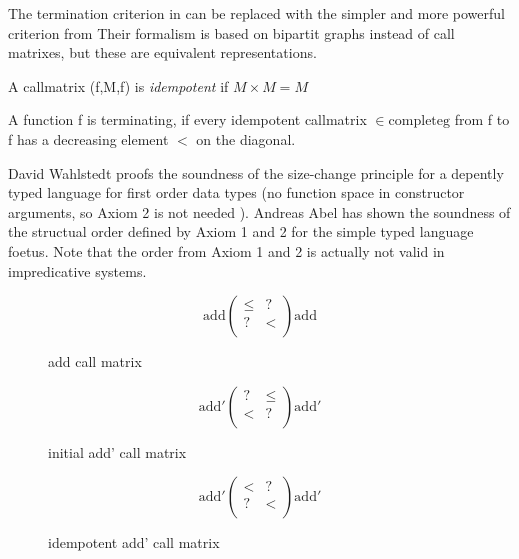 The termination criterion in \cite{abelAltenkirch:predStRec} can be replaced with the
simpler and more powerful criterion from \cite{lee01sizechange}
Their formalism is based on bipartit graphs instead of call matrixes, but these are
equivalent representations.

\begin{definition}
A callmatrix (f,M,f) is \emph{idempotent} if $ M \times M = M $ 
\end{definition}

\begin{definition}
A function f is terminating, if every idempotent callmatrix  $ \in \mathrm{complete g} $ from f to f has a decreasing element $<$ on
the diagonal.
\end{definition}

David Wahlstedt proofs the soundness of the size-change principle for a depently typed language 
for first order data types (no function space in constructor arguments, so Axiom 2 is not needed ).
Andreas Abel has shown the soundness of the structual order defined by Axiom 1 and 2 for the simple typed
language foetus.
Note that the order from Axiom 1 and 2 is actually not valid in impredicative systems.

\begin{figure}[p]
\[
\mathrm{add}\begin{pmatrix}

\leq & ? \\
?    & < \\

\end{pmatrix}\mathrm{add}
\]
\caption{add call matrix}
\end{figure}

\begin{figure}[p]

\[
\mathrm{add'} \begin{pmatrix}

? & \leq \\
< & ?   \\

\end{pmatrix} \mathrm{add'}
\]

\caption{initial add' call matrix}

\end{figure}

\begin{figure}[p]

\[
\mathrm{add'} \begin{pmatrix}

< & ?    \\
? & <    \\

\end{pmatrix} \mathrm{add'}
\] 

\caption{idempotent add' call matrix}

\end{figure}

